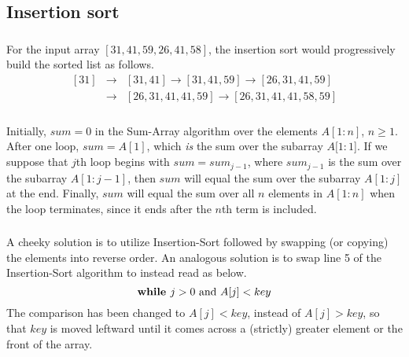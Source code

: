 \subsection{Insertion sort}

\subsubsection{}
    For the input array $[31, 41, 59, 26, 41, 58]$, the insertion sort would progressively build the sorted list as follows.
    \begin{eqnarray}
        \nonumber
        [31] &\to& [31, 41] \to [31, 41, 59] \to [26, 31, 41, 59] 
        \\
        &\to& [26, 31, 41, 41, 59] \to [26, 31, 41, 41, 58, 59]
    \end{eqnarray}

\subsubsection{}
    Initially, $sum=0$ in the Sum-Array algorithm over the elements $A[1:n]$, $n\ge1$.  After one loop, $sum = A[1]$, which {\it is} the sum over the subarray $A[1:1$].  If we suppose that $j$th loop begins with $sum=sum_{j-1}$, where $sum_{j-1}$ is the sum over the subarray $A[1:j-1]$, then $sum$ will equal the sum over the subarray $A[1:j]$ at the end.  Finally, $sum$ will equal the sum over all $n$ elements in $A[1:n]$ when the loop terminates, since it ends after the $n$th term is included.
    
\subsubsection{}
    A cheeky solution is to utilize Insertion-Sort followed by swapping (or copying) the elements into reverse order.  An analogous solution is to swap line 5 of the Insertion-Sort algorithm to instead read as below.
    \begin{equation}
        \text{\bf{while} } j > 0 \text{ and } A[j] < key
    \end{equation}
    The comparison has been changed to $A[j] < key$, instead of $A[j] > key$, so that $key$ is moved leftward until it comes across a (strictly) greater element or the front of the array.  

